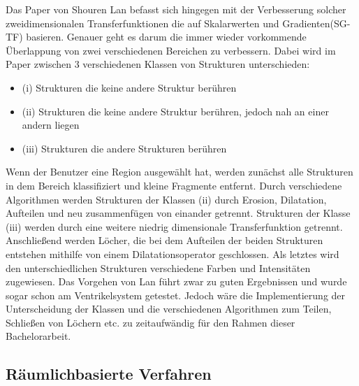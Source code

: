 Das Paper von Shouren Lan \cite{lan2017improving} befasst sich hingegen mit der Verbesserung solcher zweidimensionalen Transferfunktionen die auf Skalarwerten und Gradienten(SG-TF) basieren. Genauer geht es darum die immer wieder vorkommende Überlappung von zwei verschiedenen Bereichen zu verbessern.
\newline
Dabei wird im Paper zwischen 3 verschiedenen Klassen von Strukturen unterschieden:
\begin{itemize}
\item (i) Strukturen die keine andere Struktur berühren
\item (ii) Strukturen die keine andere Struktur berühren, jedoch nah an einer andern liegen
\item (iii) Strukturen die andere Strukturen berühren
\end{itemize} 
Wenn der Benutzer eine Region ausgewählt hat, werden zunächst alle Strukturen in dem Bereich klassifiziert und kleine Fragmente entfernt. Durch verschiedene Algorithmen werden Strukturen der Klassen (ii) durch Erosion, Dilatation, Aufteilen und neu zusammenfügen von einander getrennt. Strukturen der Klasse (iii) werden durch eine weitere niedrig dimensionale Transferfunktion getrennt. Anschließend werden Löcher, die bei dem Aufteilen der beiden Strukturen entstehen mithilfe von einem Dilatationsoperator geschlossen. Als letztes wird den unterschiedlichen Strukturen verschiedene Farben und Intensitäten zugewiesen.
\newline
Das Vorgehen von Lan führt zwar zu guten Ergebnissen und wurde sogar schon am Ventrikelsystem getestet. Jedoch wäre die Implementierung der Unterscheidung der Klassen und die verschiedenen Algorithmen zum Teilen, Schließen von Löchern etc. zu zeitaufwändig für den Rahmen dieser Bachelorarbeit.



\subsection{Räumlichbasierte Verfahren}


